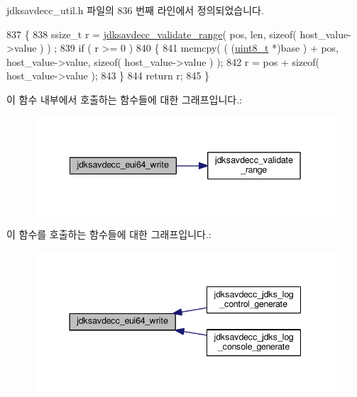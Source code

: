 jdksavdecc\+\_\+util.\+h 파일의 836 번째 라인에서 정의되었습니다.


\begin{DoxyCode}
837 \{
838     ssize\_t r = \hyperlink{group__util_ga9c02bdfe76c69163647c3196db7a73a1}{jdksavdecc\_validate\_range}( pos, len, \textcolor{keyword}{sizeof}( host\_value->value ) )
      ;
839     \textcolor{keywordflow}{if} ( r >= 0 )
840     \{
841         memcpy( ( (\hyperlink{stdint_8h_aba7bc1797add20fe3efdf37ced1182c5}{uint8\_t} *)base ) + pos, host\_value->value, \textcolor{keyword}{sizeof}( host\_value->value ) );
842         r = pos + \textcolor{keyword}{sizeof}( host\_value->value );
843     \}
844     \textcolor{keywordflow}{return} r;
845 \}
\end{DoxyCode}


이 함수 내부에서 호출하는 함수들에 대한 그래프입니다.\+:
\nopagebreak
\begin{figure}[H]
\begin{center}
\leavevmode
\includegraphics[width=342pt]{group__eui64_ga9a35f8b0a8e81f3f169892e3d0f3c7ad_cgraph}
\end{center}
\end{figure}




이 함수를 호출하는 함수들에 대한 그래프입니다.\+:
\nopagebreak
\begin{figure}[H]
\begin{center}
\leavevmode
\includegraphics[width=344pt]{group__eui64_ga9a35f8b0a8e81f3f169892e3d0f3c7ad_icgraph}
\end{center}
\end{figure}


